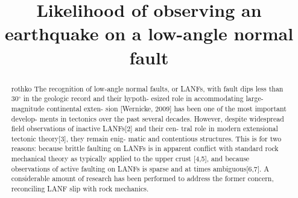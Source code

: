 \documentclass[twocolumn,grl]{AGUTeX}
\begin{document}
\title{Likelihood of observing an earthquake on a low-angle normal fault}



\begin{abstract}
rothko
The recognition of low-angle normal faults, or LANFs, with fault dips less than 30$^\circ$ in the geologic record and their hypoth- esized role in accommodating large-magnitude continental exten- sion [Wernicke, 2009] has been one of the most important develop- ments in tectonics over the past several decades. However, despite widespread field observations of inactive LANFs[2] and their cen- tral role in modern extensional tectonic theory[3], they remain enig- matic and contentious structures. This is for two reasons: because brittle faulting on LANFs is in apparent conflict with standard rock mechanical theory as typically applied to the upper crust [4,5], and because observations of active faulting on LANFs is sparse and at times ambiguous[6,7]. A considerable amount of research has been performed to address the former concern, reconciling LANF slip with rock mechanics.
\end{abstract}
\end{document}

